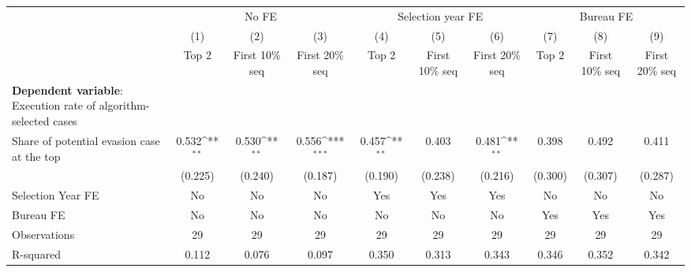 {
\def\sym#1{\ifmmode^{#1}\else\(^{#1}\)\fi}
\begin{tabular}{l*{9}{c}}
\toprule
            &\multicolumn{3}{c}{No FE}                                        &\multicolumn{3}{c}{Selection year FE}                            &\multicolumn{3}{c}{Bureau FE}                                    \\\cmidrule(lr){2-4}\cmidrule(lr){5-7}\cmidrule(lr){8-10}
            &\multicolumn{1}{c}{(1)}&\multicolumn{1}{c}{(2)}&\multicolumn{1}{c}{(3)}&\multicolumn{1}{c}{(4)}&\multicolumn{1}{c}{(5)}&\multicolumn{1}{c}{(6)}&\multicolumn{1}{c}{(7)}&\multicolumn{1}{c}{(8)}&\multicolumn{1}{c}{(9)}\\
            &\multicolumn{1}{c}{Top 2}&\multicolumn{1}{c}{First 10\% seq}&\multicolumn{1}{c}{First 20\% seq}&\multicolumn{1}{c}{Top 2}&\multicolumn{1}{c}{First 10\% seq}&\multicolumn{1}{c}{First 20\% seq}&\multicolumn{1}{c}{Top 2}&\multicolumn{1}{c}{First 10\% seq}&\multicolumn{1}{c}{First 20\% seq}\\
\midrule
\textbf{Dependent variable}: Execution rate of algorithm-selected cases&                     &                     &                     &                     &                     &                     &                     &                     &                     \\
\addlinespace
Share of potential evasion case at the top&       0.532\sym{**} &       0.530\sym{**} &       0.556\sym{***}&       0.457\sym{**} &       0.403         &       0.481\sym{**} &       0.398         &       0.492         &       0.411         \\
            &     (0.225)         &     (0.240)         &     (0.187)         &     (0.190)         &     (0.238)         &     (0.216)         &     (0.300)         &     (0.307)         &     (0.287)         \\
\midrule
Selection Year FE&          No         &          No         &          No         &         Yes         &         Yes         &         Yes         &          No         &          No         &          No         \\
Bureau FE   &          No         &          No         &          No         &          No         &          No         &          No         &         Yes         &         Yes         &         Yes         \\
Observations&          29         &          29         &          29         &          29         &          29         &          29         &          29         &          29         &          29         \\
R-squared   &       0.112         &       0.076         &       0.097         &       0.350         &       0.313         &       0.343         &       0.346         &       0.352         &       0.342         \\
\bottomrule
\end{tabular}
}
